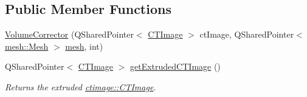 \subsection*{Public Member Functions}
\begin{DoxyCompactItemize}
\item 
\hyperlink{classctimage_1_1_volume_corrector_a38ceb67dfbd2ff41d8c87c1c5853a3b3}{VolumeCorrector} (QSharedPointer$<$ \hyperlink{classctimage_1_1_c_t_image}{CTImage} $>$ ctImage, QSharedPointer$<$ \hyperlink{classmesh_1_1_mesh}{mesh::Mesh} $>$ \hyperlink{classctimage_1_1_volume_corrector_a619b8444da48d717b5314a04b39fc6cd}{mesh}, int)
\item 
QSharedPointer$<$ \hyperlink{classctimage_1_1_c_t_image}{CTImage} $>$ \hyperlink{classctimage_1_1_volume_corrector_ae7766967e85dd56a1e0809fd75365557}{getExtrudedCTImage} ()
\begin{DoxyCompactList}\small\item\em Returns the extruded \hyperlink{classctimage_1_1_c_t_image}{ctimage::CTImage}. \item\end{DoxyCompactList}\end{DoxyCompactItemize}
